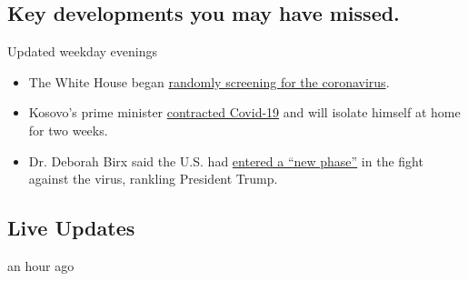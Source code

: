 \hypertarget{key-developments-you-may-have-missed}{%
\subsection{Key developments you may have
missed.}\label{key-developments-you-may-have-missed}}

Updated weekday evenings

\begin{itemize}
\tightlist
\item
  The White House began
  \href{https://www.nytimes.com/2020/08/03/world/coronavirus-covid-19.html\#link-c4a1d71}{randomly
  screening for the coronavirus}.
\item
  Kosovo's prime minister
  \href{https://nl.nytimes.com/f/a/umYjgHqFQS0DWGLnViksGQ~~/AAAAAQA~/RgRhCxH_P4QgAWh0dHBzOi8vd3d3LnJldXRlcnMuY29tL2FydGljbGUvdXMtaGVhbHRoLWNvcm9uYXZpcnVzLWtvc292by1wcmltZW1pbmlzdC9rb3Nvdm8tcHJpbWUtbWluaXN0ZXItc2F5cy1oZS1oYXMtY292aWQtMTktaWRVU0tCTjI0WTBPTj9jYW1wYWlnbl9pZD0xNTQmZW1jPWVkaXRfY2JfMjAyMDA4MDMmaW5zdGFuY2VfaWQ9MjA5NDQmbmw9Y29yb25hdmlydXMtYnJpZWZpbmcmcmVnaV9pZD0zNTQ2NDU0MSZzZWdtZW50X2lkPTM1MTI5JnRlPTEmdXNlcl9pZD02Njg0MjBkMWQ1MGVjZTM5ZTdlNGNkYmRkYzAxOTZkMFcDbnl0QgoAMv-MKF_UfRy_UhhrYXJlbi5iYXJyb3dAbnl0aW1lcy5jb21YBAAAAAA~}{contracted
  Covid-19} and will isolate himself at home for two weeks.
\item
  Dr. Deborah Birx said the U.S. had
  \href{https://www.nytimes.com/2020/08/03/world/coronavirus-covid-19.html}{entered
  a ``new phase''} in the fight against the virus, rankling President
  Trump.
\end{itemize}

\hypertarget{live-updates}{%
\subsection{Live Updates}\label{live-updates}}

an hour ago

